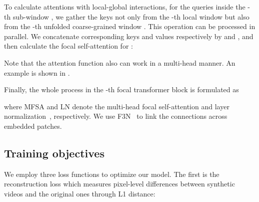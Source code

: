 \documentclass[final]{cvpr}
\begin{document}
To calculate attentions with local-global interactions, for the queries inside the -th sub-window , we gather the keys not only from the -th local window  but also from the -th unfolded coarse-grained window .
This operation can be processed in parallel.
We concatenate corresponding keys and values respectively by  and , and then calculate the focal self-attention for :

Note that the attention function also can work in a multi-head manner.
An example is shown in .

Finally, the whole process in the -th focal transformer block is formulated as


where MFSA and LN denote the multi-head focal self-attention and layer normalization~\cite{ba2016layer}, respectively.
We use F3N~\cite{Liu_2021_FuseFormer} to link the connections across embedded patches.

\subsection{Training objectives}
\label{sec:train_object}
We employ three loss functions to optimize our model.
The first is the reconstruction loss which measures pixel-level differences between synthetic videos  and the original ones  through L1 distance:
\end{document}
